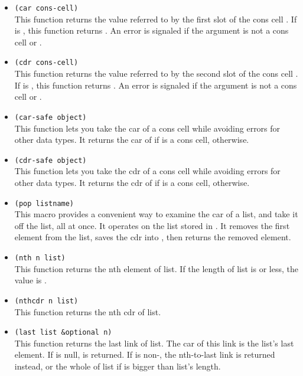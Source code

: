 \begin{itemize}
\item \lstinline|(car cons-cell)|\\
  This function returns the value referred to by the first slot of the cons cell .
  If  is , this function returns .
  An error is signaled if the argument is not a cons cell or .
\item \lstinline|(cdr cons-cell)|\\
  This function returns the value referred to by the second slot of the cons cell .
  If  is , this function returns .
  An error is signaled if the argument is not a cons cell or .
\item \lstinline|(car-safe object)|\\
  This function lets you take the car of a cons cell while avoiding errors for other data types.
  It returns the car of  if  is a cons cell,  otherwise.
\item \lstinline|(cdr-safe object)|\\
  This function lets you take the cdr of a cons cell while avoiding errors for other data types.
  It returns the cdr of  if  is a cons cell,  otherwise.
\item \lstinline|(pop listname)|\\
  This macro provides a convenient way to examine the car of a list, and take it off the list, all at once.
  It operates on the list stored in .
  It removes the first element from the list, saves the cdr into , then returns the removed element.
\item \lstinline|(nth n list)|\\
  This function returns the nth element of list.
  If the length of list is  or less, the value is .
\item \lstinline|(nthcdr n list)|\\
  This function returns the nth cdr of list. 
\item \lstinline|(last list &optional n)|\\
  This function returns the last link of list.
  The car of this link is the list’s last element.
  If  is null,  is returned.
  If  is non-, the nth-to-last link is returned instead, or the whole of list if  is bigger than list’s length.

\end{itemize}
